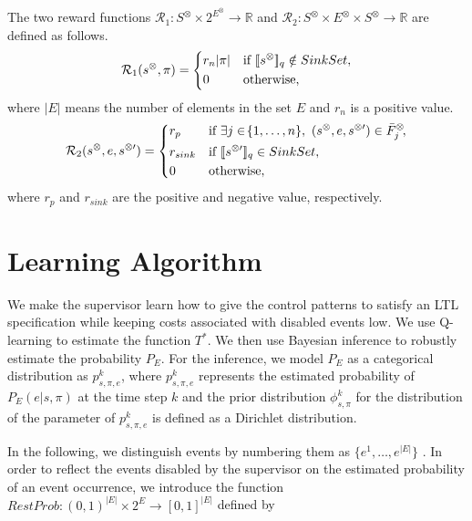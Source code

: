 \begin{definition}
  The two reward functions $\mathcal{R}_1 : S^{\otimes} \times 2^{E^{\otimes}} \rightarrow \mathbb{R}$ and $\mathcal{R}_2 : S^{\otimes} \times E^{\otimes} \times S^{\otimes} \rightarrow \mathbb{R}$ are defined as follows.
  \begin{align}
    \mathcal{R}_1 (s^{\otimes}, \pi) =
    \left\{
    \begin{aligned}
      & r_{n}|\pi| & &\text{if} \ [\![s^{\otimes}]\!]_q \notin SinkSet , \\
      & 0 & &\text{otherwise},
    \end{aligned}
    \right.
  \end{align}
  where $|E|$ means the number of elements in the set $E$ and $r_{n}$ is a positive value.
  \begin{align}
    \mathcal{R}_2(s^{\otimes}, e, s^{\otimes \prime}) =
    \left\{
    \begin{aligned}
      &r_p & & \text{if}\ \exists j \in \! \{ 1, \ldots ,n \},\ (s^{\otimes}, e, s^{\otimes \prime}) \in \bar{F}^{\otimes}_j \!,\\
      &r_{sink} & & \text{if}\ [\![s^{\otimes \prime}]\!]_q \in SinkSet,\\
      &0 & & \text{otherwise},
    \end{aligned}
    \right.
  \end{align}
  where $r_p$ and $r_{sink}$ are the positive and negative value, respectively.
  \label{reward_def}
\end{definition}

\section{Learning Algorithm}
We make the supervisor learn how to give the control patterns to satisfy an LTL specification while keeping costs associated with disabled events low. We use Q-learning to estimate the function $T^{\ast}$. We then use Bayesian inference to robustly estimate the probability $P_E$. For the inference, we model $P_E$ as a categorical distribution as $p^k_{s,\pi,e}$, where $p^k_{s,\pi,e}$ represents the estimated probability of $P_E(e|s,\pi)$ at the time step $k$ and the prior distribution $\phi^k_{s,\pi}$ for the distribution of the parameter of $p^k_{s,\pi,e}$ is defined as a Dirichlet distribution.

In the following, we distinguish events by numbering them as $\{ e^1, \ldots, e^{|E|} \}$ . In order to reflect the events disabled by the supervisor on the estimated probability of an event occurrence, we introduce the function $RestProb : (0,1)^{|E|} \times 2^E \rightarrow [0,1]^{|E|}$ defined by

